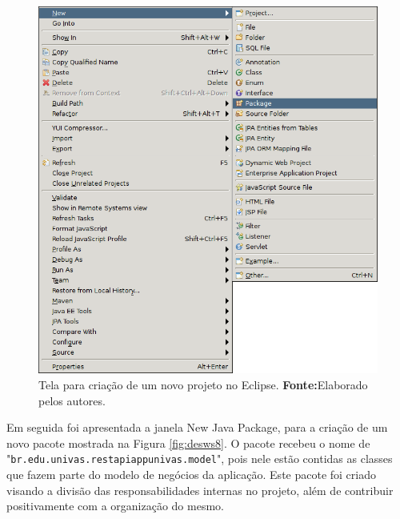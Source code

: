 	\begin{figure}[h!]
		\centerline{\includegraphics[scale=0.8]{./imagens/2_q_metodologico/4_procedimentos_resultados/43_webservice/432_desenvolvimento/desws7.png}}
		\caption[Tela para criação de um novo projeto no Eclipse]{Tela para criação de um novo projeto no Eclipse.
			\textbf{Fonte:}Elaborado pelos autores.}
		\label{fig:desws7}
	\end{figure}
	
	\pagebreak 
	
	\par Em seguida foi apresentada a janela New Java Package, para a criação de
um novo pacote mostrada na Figura \ref{fig:desws8}. O pacote recebeu o nome de
"\texttt{br.edu.univas.restapiappunivas.model}", pois nele estão contidas as
classes que fazem parte do modelo de negócios da aplicação. Este pacote foi
criado visando a divisão das responsabilidades internas no projeto, além de
contribuir positivamente com a organização do mesmo.

